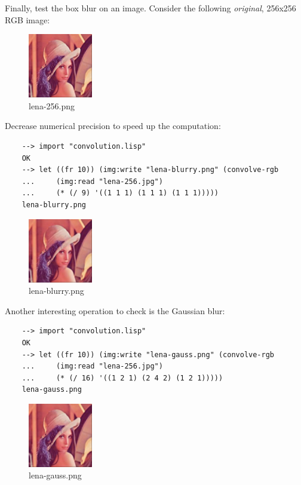 Finally, test the box blur on an image. Consider the following \textit{original}, 256x256 RGB image:

\begin{figure}[h]
    \caption{lena-256.png}
    \centering
    \includegraphics[width=0.25\textwidth]{figures/lena-256.jpg}
\end{figure}

Decrease numerical precision to speed up the computation:

\begin{Verbatim}
    --> import "convolution.lisp"
    OK
    --> let ((fr 10)) (img:write "lena-blurry.png" (convolve-rgb
    ...     (img:read "lena-256.jpg")
    ...     (* (/ 9) '((1 1 1) (1 1 1) (1 1 1)))))
    lena-blurry.png
\end{Verbatim}

\begin{figure}[h]
    \caption{lena-blurry.png}
    \centering
    \includegraphics[width=0.25\textwidth]{figures/lena-blurry.png}
\end{figure}

Another interesting operation to check is the Gaussian blur:

\begin{Verbatim}
    --> import "convolution.lisp"
    OK
    --> let ((fr 10)) (img:write "lena-gauss.png" (convolve-rgb
    ...     (img:read "lena-256.jpg")
    ...     (* (/ 16) '((1 2 1) (2 4 2) (1 2 1)))))
    lena-gauss.png
\end{Verbatim}

\begin{figure}[h]
    \caption{lena-gauss.png}
    \centering
    \includegraphics[width=0.25\textwidth]{figures/lena-gauss.png}
\end{figure}

